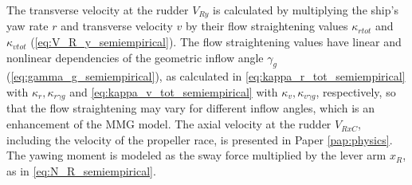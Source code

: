 The transverse velocity at the rudder $V_{Ry}$ is calculated by multiplying the ship's yaw rate $r$ and transverse velocity $v$ by their flow straightening values $\kappa_{rtot}$ and $\kappa_{vtot}$ (\autoref{eq:V_R_y_semiempirical}). The flow straightening values have linear and nonlinear dependencies of the geometric inflow angle $\gamma_g$ (\autoref{eq:gamma_g_semiempirical}), as calculated in \autoref{eq:kappa_r_tot_semiempirical} with $\kappa_r,\kappa_{r \gamma g}$ and \autoref{eq:kappa_v_tot_semiempirical} with $\kappa_v,\kappa_{v \gamma g}$, respectively, so that the flow straightening may vary for different inflow angles, which is an enhancement of the MMG model.
The axial velocity at the rudder $V_{RxC}$, including the velocity of the propeller race, is presented in Paper \ref{pap:physics}.
\begin{equation}
    \label{eq:V_R_y_semiempirical}
    
\end{equation}
%
\begin{equation}
    \label{eq:kappa_r_tot_semiempirical}
    
\end{equation}
%
\begin{equation}
    \label{eq:kappa_v_tot_semiempirical}
    
\end{equation}
%
\begin{equation}
    \label{eq:gamma_g_semiempirical}
    
\end{equation}
The yawing moment is modeled as the sway force multiplied by the lever arm $x_R$, as in \autoref{eq:N_R_semiempirical}.
\begin{equation}
    \label{eq:N_R_semiempirical}
    
\end{equation}
%
%

